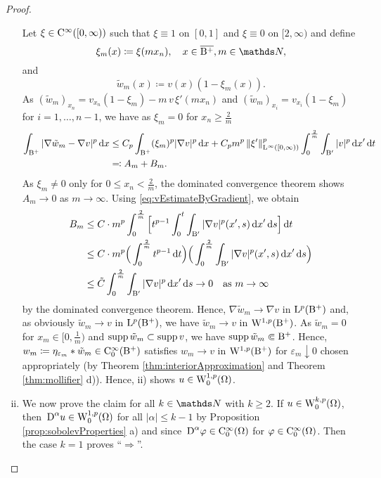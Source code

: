 \begin{proof}
\begin{enumerate}[i)]
    Let $\xi \in \mathrm{C}^\infty([0,\infty))$ such that $\xi \equiv 1$ on $[0,1]$ and $\xi \equiv 0$ on $[2,\infty)$ and define 
      $$\xi_m (x) \coloneqq \xi(mx_n), \quad x \in \overline{\BB^+}, m \in \N,$$ and 
      $$\tilde w_m(x) \coloneqq v(x)(1 - \xi_m(x)).$$
      As $(\tilde w_m)_{x_n} = v_{x_n}(1 - \xi_m) - m\, v\, \xi'(m x_n)$ and $(\tilde w_m)_{x_i} = v_{x_i}(1 - \xi_m)$ for $i = 1,\dots,n-1$, we have as $\xi_m =0$ for $x_n \geq \frac{2}{m}$
      \begin{align*}
      \int_{\mathrm{B}^+} |\nabla \tilde w_m - \nabla v|^p \, {\operatorname{d}\!{x}}
      &\leq C_p \int_{\mathrm{B}^+} (\xi_m)^p |\nabla v|^p \, {\operatorname{d}\!{x}} + C_p m^p\, \|\xi'\|_{\mathrm{L}^\infty([0,\infty))}^p \int_0^{\frac{2}{m}} \int_{\mathrm{B}'} |v|^p \, {\operatorname{d}\!{x}}' \, {\operatorname{d}\!{t}} \\
        &\eqqcolon A_m + B_m.
      \end{align*}
      As $\xi_m \neq 0$ only for $0 \leq x_n < \frac{2}{m}$, the dominated convergence theorem shows $A_m \to 0$ as $m \to \infty$.
      Using \eqref{eq:vEstimateByGradient}, we obtain
      \begin{align*}
      B_m 
      &\leq C \cdot m^p  \int_0^{\frac{2}{m}}\Big[ t^{p - 1} \int_0^{t} \int_{\BB'} |\nabla v|^p(x',s) \d x' \d s \Big] \d t \\
      &\leq C \cdot m^p \Big( \int_0^{\frac{2}{m}} t^{p - 1} \d t \Big) \Big( \int_0^{\frac{2}{m}} \int_{\BB'} |\nabla v|^p(x',s) \d x' \d s \Big) \\
      &\leq \tilde C \int_0^{\frac{2}{m}} \int_{\BB'} |\nabla v|^p \d x' \d s \to 0 \quad\text{as } m \to \infty 
      \end{align*}
      by the dominated convergence theorem.
      Hence, $\nabla \tilde w_m \to \nabla v$ in $\mathrm{L}^p(\mathrm{B}^+)$ and, as obviously $\tilde w_m \to v$ in $\mathrm{L}^p(\mathrm{B}^+)$, we have $\tilde w_m \to v$ in $\mathrm{W}^{1,p}(\mathrm{B}^+)$.
      As $\tilde w_m = 0$ for $x_m \in [0,\frac{1}{m})$ and $\operatorname{supp} \tilde w_m \subset \operatorname{supp} v$, we have $\operatorname{supp} \tilde w_m \Subset \mathrm{B}^+$.
        Hence, $w_m \coloneqq \eta_{\varepsilon_m} \ast \tilde w_m \in \mathrm{C}_0^\infty(\mathrm{B}^+)$ satisfies $w_m \to v$ in $\mathrm{W}^{1,p}(\mathrm{B}^+)$ for $\varepsilon_m \downarrow 0$ chosen appropriately (by Theorem \ref{thm:interiorApproximation} and Theorem \ref{thm:mollifier} d)).
        Hence, ii) shows $u \in \mathrm{W}_0^{1,p}(\Omega)$.

      \item We now prove the claim for all $k \in \N$ with $k \geq 2$.
        If $u \in \mathrm{W}_0^{k,p}(\Omega)$, then $\,{\operatorname{D}}^\alpha u \in \mathrm{W}_0^{1,p}(\Omega)$ for all $|\alpha| \leq k -1$ by Proposition \ref{prop:sobolevProperties} a) and since $\,{\operatorname{D}}^\alpha \varphi \in \mathrm{C}_0^\infty(\Omega)$ for $\varphi \in \mathrm{C}_0^\infty(\Omega)$.
        Then the case $k = 1$ proves ``$\Rightarrow$''.


\end{enumerate}
\end{proof}
